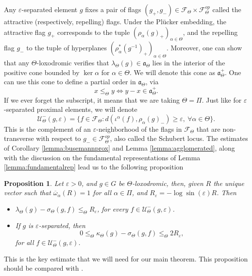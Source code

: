 \documentclass{amsart}
\newtheorem{prop}[thm]{Proposition}
\theoremstyle{remark}
\theoremstyle{definition}
\begin{document}
Any $\varepsilon$-separated element $g$ fixes a pair of flags $(g_+,g_-) \in \mathcal{F}_\Theta \times \mathcal{F}_\Theta^{op}$ called the attractive (respectively, repelling) flags.
Under the Plücker embedding, the attractive flag $g_+$ corresponds to the tuple $(\rho_\alpha (g)_+)_{\alpha \in \Theta}$, and the repelling flag $g_-$ to the tuple of hyperplanes $(\rho_\alpha^* (g^{-1})_+)_{\alpha \in \Theta}$.
Moreover, one can show that any $\Theta$-loxodromic verifies that $\lambda_\Theta (g) \in \mathfrak{a}_\Theta$ lies in the interior of the positive cone bounded by $\ker \alpha$ for $\alpha \in \Theta$.
We will denote this cone as $\mathfrak{a}_\Theta^+$.
One can use this cone to define a partial order in $\mathfrak{a}_\Theta$, via
$$x \leq_\Theta y \Leftrightarrow y - x \in \mathfrak{a}_\Theta^+.$$
If we ever forget the subscript, it means that we are taking $\Theta = \Pi$.
Just like for $\varepsilon$-separated proximal elements, we will denote
$$\mathcal{U}^-_\Theta (g,\varepsilon) = \{ f \in \mathcal{F}_\Theta: d(\iota^\alpha (f), \rho_\alpha (g)_-) \geq \varepsilon, \: \forall \alpha \in \Theta\}.$$
This is the complement of an $\varepsilon$-neighborhood of the flags in $\mathcal{F}_\Theta$ that are non-transverse with respect to $g_-\in \mathcal{F}_\Theta^{op}$, also called the Schubert locus.
The estimates of Corollary \ref{lemma:busemannprox} and Lemma \ref{lemma:agglomerated}, along with the discussion on the fundamental representations of Lemma \ref{lemma:fundamentalrep} lead us to the following proposition

\begin{prop}
\label{coro:estimatesgeneralcase}
 Let $\varepsilon >0$, and $g \in G$ be $\Theta$-loxodromic, then, given $R$ the unique vector such that $\overline{\omega}_\alpha (R) =1$ for all $\alpha \in \Pi$, and $R_\varepsilon = - \log \sin (\varepsilon) R$. Then
 \begin{itemize}
    \item $\lambda_\Theta (g) - \sigma_\Theta (g,f) \leq_\Theta R_{\varepsilon}$, for every $f \in \mathcal{U}^-_\Theta (g,\varepsilon)$.
    \item If $g$ is $\varepsilon$-separated, then 
    $$0 \leq_\Theta \kappa_\Theta (g) - \sigma_\Theta (g,f) \leq_\Theta 2 R_\varepsilon,$$ 
 for all $f \in \mathcal{U}^-_\Theta (g,\varepsilon)$.
 \end{itemize}
\end{prop}

This is the key estimate that we will need for our main theorem.
This proposition should be compared with \cite[Lemma 3.4]{quint2003indicateur}.
\end{document}
